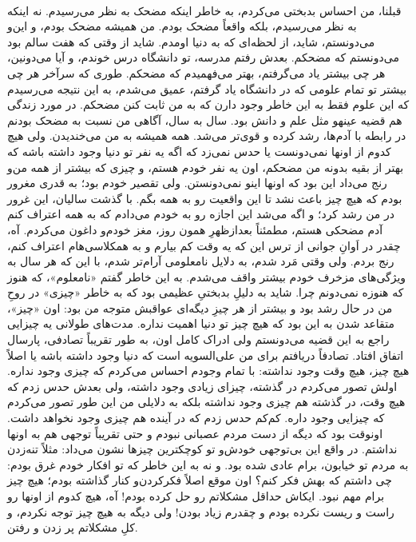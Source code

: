 \documentclass[12pt]{book}
\begin{document}
    \paragraph{}
    قبلنا، من احساس بدبختی می‌کردم، به خاطر اینکه مضحک به نظر می‌رسیدم. نه اینکه به نظر می‌رسیدم، بلکه واقعاً مضحک بودم. من همیشه مضحک بودم، و این‌و می‌دونستم، شاید، از لحظه‌ای که به دنیا اومدم. شاید از وقتی که هفت سالم بود می‌دونستم که مضحکم. بعدش رفتم مدرسه، تو دانشگاه درس خوندم، و آیا می‌دونین، هر چی بیشتر یاد می‌گرفتم، بهتر می‌فهمیدم که مضحکم. طوری که سرآخر هر چی بیشتر تو تمام علومی که در دانشگاه یاد گرفتم، عمیق می‌شدم، به این نتیجه می‌رسیدم که این علوم فقط به این خاطر وجود دارن که به من ثابت کنن مضحکم. در مورد زندگی هم قضیه عینهو مثل علم و دانش بود. سال به سال، آگاهی من نسبت به مضحک بودنم در رابطه با آدم‌ها، رشد کرده و قوی‌تر می‌شد. همه همیشه به من می‌خندیدن. ولی هیچ کدوم از اونها نمی‌دونست یا حدس نمی‌زد که اگه یه نفر تو دنیا وجود داشته باشه که بهتر از بقیه بدونه من مضحکم، اون یه نفر خودم هستم، و چیزی که بیشتر از همه من‌و رنج می‌داد این بود که اونها اینو نمی‌دونستن. ولی تقصیر خودم بود؛ به قدری مغرور بودم که هیچ چیز باعث نشد تا این واقعیت رو به همه بگم. با گذشت سالیان، این غرور در من رشد کرد؛ و اگه می‌شد این اجازه رو به خودم می‌دادم که به همه اعتراف کنم آدم مضحکی هستم، مطمئناً بعدازظهرِ همون روز، مغز خودم‌و داغون می‌کردم. آه، چقدر در اَوانِ جوانی از ترس این که یه وقت کم بیارم و به همکلاسی‌هام اعتراف کنم، رنج بردم. ولی وقتی مَرد شدم، به دلایل نامعلومی آرام‌تر شدم، با این که هر سال به ویژگی‌های مزخرف خودم بیشتر واقف می‌شدم. به این خاطر گفتم «نامعلوم»، که هنوز که هنوزه نمی‌دونم چرا. شاید به دلیلِ بدبختیِ عظیمی بود که به خاطر «چیزی» در روحِ من در حال رشد بود و بیشتر از هر چیزِ دیگه‌ای عواقبش متوجه من بود: اون «چیز»، متقاعد شدن به این بود که هیچ چیز تو دنیا اهمیت نداره. مدت‌های طولانی یه چیزایی راجع به این قضیه می‌دونستم ولی ادراک کامل اون، به طور تقریباً تصادفی، پارسال اتفاق افتاد. تصادفاً دریافتم برای من علی‌السویه است که دنیا وجود داشته باشه یا اصلاً هیچ چیز، هیچ وقت وجود نداشته: با تمام وجودم احساس می‌کردم که چیزی وجود نداره. اولش تصور می‌کردم در گذشته، چیزای زیادی وجود داشته، ولی بعدش حدس زدم که هیچ وقت، در گذشته هم چیزی وجود نداشته بلکه به دلایلی من این طور تصور می‌کردم که چیزایی وجود داره. کم‌کم حدس زدم که در آینده هم چیزی وجود نخواهد داشت. اونوقت بود که دیگه از دست مردم عصبانی نبودم و حتی تقریباً توجهی هم به اونها نداشتم. در واقع این بی‌توجهی خودش‌و تو کوچکترین چیزها نشون می‌داد: مثلاً تنه‌زدن به مردم تو خیابون، برام عادی شده بود. و نه به این خاطر که تو افکار خودم غرق بودم: چی داشتم که بهش فکر کنم؟ اون موقع اصلاً فکرکردن‌و کنار گذاشته بودم؛ هیچ چیز برام مهم نبود. ایکاش حداقل مشکلاتم رو حل کرده بودم! آه، هیچ کدوم از اونها رو راست و ریست نکرده بودم و چقدرم زیاد بودن! ولی دیگه به هیچ چیز توجه نکردم، و کلِ مشکلاتم پر زدن و رفتن.
\end{document}
